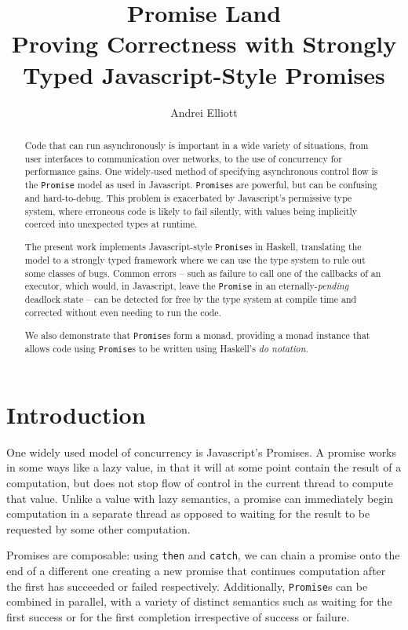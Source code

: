\documentclass[12pt, english, letterpaper]{kuthesis}
\title{Promise Land\\
\large Proving Correctness with Strongly Typed Javascript-Style Promises}
\author{Andrei Elliott}
\newcommand{\lit}[1]{\texttt{#1}}
\begin{document}
\begin{romanpages}
  \maketitle
  \begin{abstract}
    Code that can run asynchronously is important in a wide variety of situations, from user interfaces to communication over networks, to the use of concurrency for performance gains.  One widely-used method of specifying asynchronous control flow is the \lit{Promise} model as used in Javascript.  \lit{Promise}s are powerful, but can be confusing and hard-to-debug.  This problem is exacerbated by Javascript’s permissive type system, where erroneous code is likely to fail silently, with values being implicitly coerced into unexpected types at runtime.

The present work implements Javascript-style \lit{Promise}s in Haskell, translating the model to a strongly typed framework where we can use the type system to rule out some classes of bugs.
Common errors – such as failure to call one of the callbacks of an executor, which would, in Javascript, leave the \lit{Promise} in an eternally-\emph{pending} deadlock state – can be detected for free by the type system at compile time and corrected without even needing to run the code.

We also demonstrate that \lit{Promise}s form a monad, providing a monad instance that allows code using \lit{Promise}s to be written using Haskell’s \emph{do notation}.
  \end{abstract}
\end{romanpages}

\chapter*{Introduction}
One widely used model of concurrency is Javascript's Promises.  A promise works in some ways like a lazy value, in that it will at some point contain the result of a computation, but does not stop flow of control in the current thread to compute that value.  Unlike a value with lazy semantics, a promise can immediately begin computation in a separate thread as opposed to waiting for the result to be requested by some other computation.

Promises are composable: using \lit{then} and \lit{catch}, we can chain a promise onto the end of a different one creating a new promise that continues computation after the first has succeeded or failed respectively.  Additionally, \lit{Promise}s can be combined in parallel, with a variety of distinct semantics such as waiting for the first success or for the first completion irrespective of success or failure.
\end{document}
